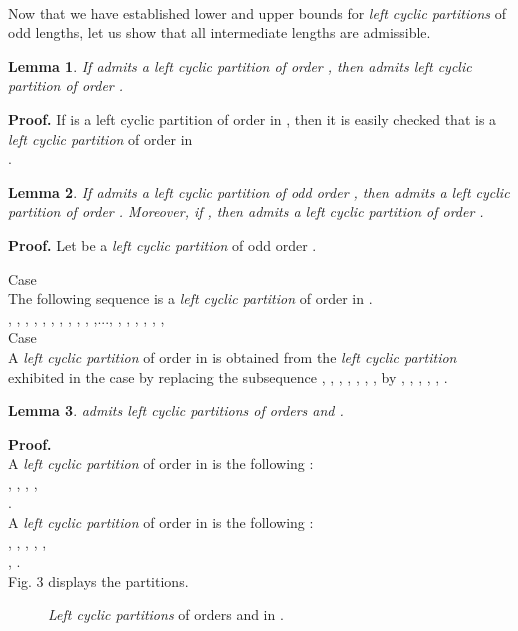 \documentclass{article}
\newtheorem{lemma}{Lemma}
\begin{document}
\\
Now that we have established lower and upper bounds for {\em left cyclic
  partitions} of odd lengths, let us show that 
all intermediate lengths are admissible.
\begin{lemma}   \label{lem:rec}
If  admits a {\em left cyclic partition} of order , then  
admits left cyclic partition of order .
\end{lemma}
{\bf Proof.} If  is a left cyclic partition of order 
 in , then it is easily checked that  is
a {\em left cyclic 
partition} of order  in \\
 .

\begin{lemma}   \label{lem:suiv}
If  admits a {\em left cyclic partition} of odd order ,  then   
admits a {\em left cyclic partition} of order . Moreover, if , then 
 admits a left cyclic partition of order .
\end{lemma}
{\bf Proof.} Let  be a {\em left cyclic partition} of
odd order .

 Case \\
The following sequence is a {\em left cyclic partition} of order  in
.\\
, , , , , , 
,
 , , , ,..., , ,
 , , , ,\\ 

 Case \\
A {\em left cyclic partition} of order  in
 is obtained from the {\em left cyclic partition} exhibited in the
case  by replacing the subsequence 
, , , , , , ,  
by 
 , , , , , .\\


\begin{lemma}   \label{lem:57}
 admits left 
cyclic partitions of orders  and .
\end{lemma}
{\bf Proof.}\\
  A {\em left cyclic partition} of order  in  is the following
:\\
, , 
, ,\\ 
.\\
 A {\em left cyclic partition} of order  in  is the following
:\\
, , 
, , 
, \\, 
.\\
Fig. 3 displays the partitions. 
\begin{figure}[htbp]
\centering
\epsfxsize=8.6cm
\caption{\label{partgraph} {\em Left cyclic partitions} of orders  and  in .}
\end{figure}\\
\end{document}
